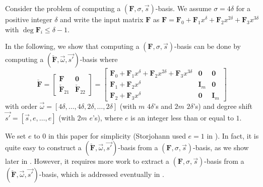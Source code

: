 Consider the problem of computing a $\left(\mathbf{F},\sigma,\vec{s}\right)$-basis.
We assume $\sigma=4\delta$ for a positive integer $\delta$ and write
the input matrix $\mathbf{F}$ as $\mathbf{F}=\mathbf{F}_{0}+\mathbf{F}_{1}x^{\delta}+\mathbf{F}_{2}x^{2\delta}+\mathbf{F}_{3}x^{3\delta}$
with $\deg\mathbf{F}_{i}\le\delta-1$.%
\begin{comment}
(The results below hold for any positive integer great than one, but
4 is used for simplicity. ) 
\end{comment}
{} In the following, we show that computing a $\left(\mathbf{F},\sigma,\vec{s}\right)$-basis
can be done by computing a $(\check{\mathbf{F}},\vec{\omega},\vec{s'})$-basis
where \begin{equation}
\check{\mathbf{F}}=\left[\begin{array}{cc}
\mathbf{F} & \mathbf{0}\\
\check{\mathbf{F}}_{21} & \check{\mathbf{F}}_{22}\end{array}\right]=\left[\begin{array}{l|cr}
\mathbf{F}_{0}+\mathbf{F}_{1}x^{\delta}+\mathbf{F}_{2}x^{2\delta}+\mathbf{F}_{3}x^{3\delta} & \mathbf{0} & \mathbf{0}\\
\hline \mathbf{F}_{1}+\mathbf{F}_{2}x^{\delta} & \mathbf{I}_{m} & \mathbf{0}\\
\mathbf{F}_{2}+\mathbf{F}_{3}x^{\delta} & \mathbf{0} & \mathbf{I}_{m}\end{array}\right]\label{eq:extendedSTransformTop}\end{equation}
 with order $\vec{\omega}=\left[4\delta,\dots,4\delta,2\delta,\dots,2\delta\right]$
(with $m$ $4\delta$'s and $2m$ $2\delta$'s) and degree shift $\vec{s'}=\left[\vec{s},e,\dots,e\right]$
(with $2m$ $e$'s), where $e$ is an integer less than or equal to
$1$. %
\begin{comment}
actually true for $e\le\min\vec{s}+1$. keeping this $e$ helps to
show that this hold true in more general situations, while Storjohann
only used $e=1$. it can be negative as well. 
\end{comment}
{}We set $e$ to $0$ in this paper for simplicity (Storjohann used
$e=1$ in \citep{Storjohann:2006}). In fact, it is quite easy to
construct a $(\check{\mathbf{F}},\vec{\omega},\vec{s'})$-basis from
a $\left(\mathbf{F},\sigma,\vec{s}\right)$-basis, as we show later
in . However, it requires more work to extract
a $\left(\mathbf{F},\sigma,\vec{s}\right)$-basis from a $(\check{\mathbf{F}},\vec{\omega},\vec{s'})$-basis,
which is addressed eventually in .

